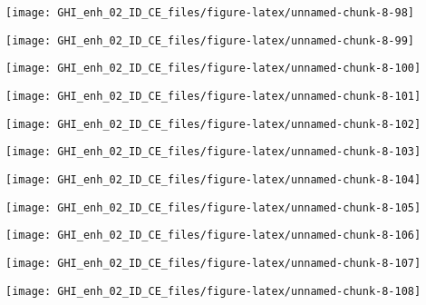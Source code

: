 \documentclass[
  10pt,
  a4paper,oneside]{article}
\begin{document}
\begin{center}\texttt{[image: GHI\_enh\_02\_ID\_CE\_files/figure-latex/unnamed-chunk-8-98]} \end{center}

\begin{center}\texttt{[image: GHI\_enh\_02\_ID\_CE\_files/figure-latex/unnamed-chunk-8-99]} \end{center}

\begin{center}\texttt{[image: GHI\_enh\_02\_ID\_CE\_files/figure-latex/unnamed-chunk-8-100]} \end{center}

\begin{center}\texttt{[image: GHI\_enh\_02\_ID\_CE\_files/figure-latex/unnamed-chunk-8-101]} \end{center}

\begin{center}\texttt{[image: GHI\_enh\_02\_ID\_CE\_files/figure-latex/unnamed-chunk-8-102]} \end{center}

\begin{center}\texttt{[image: GHI\_enh\_02\_ID\_CE\_files/figure-latex/unnamed-chunk-8-103]} \end{center}

\begin{center}\texttt{[image: GHI\_enh\_02\_ID\_CE\_files/figure-latex/unnamed-chunk-8-104]} \end{center}

\begin{center}\texttt{[image: GHI\_enh\_02\_ID\_CE\_files/figure-latex/unnamed-chunk-8-105]} \end{center}

\begin{center}\texttt{[image: GHI\_enh\_02\_ID\_CE\_files/figure-latex/unnamed-chunk-8-106]} \end{center}

\begin{center}\texttt{[image: GHI\_enh\_02\_ID\_CE\_files/figure-latex/unnamed-chunk-8-107]} \end{center}

\begin{center}\texttt{[image: GHI\_enh\_02\_ID\_CE\_files/figure-latex/unnamed-chunk-8-108]} \end{center}
\end{document}

